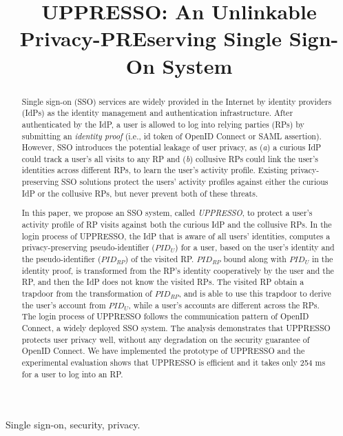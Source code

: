 \documentclass[conference, 10pt]{IEEEtran}
\begin{document}
\title{{UPPRESSO}: An Unlinkable Privacy-PREserving Single Sign-On System}
\maketitle
\begin{abstract}
Single sign-on (SSO) services
     are widely provided in the Internet by identity providers (IdPs) as the identity management
      and authentication infrastructure.
After authenticated by the IdP,
    a user is allowed to log into relying parties (RPs) by submitting an \emph{identity proof}
    (i.e., id token of OpenID Connect or SAML assertion).
However,
    SSO introduces the potential leakage of user privacy,
        as (\emph{a}) a curious IdP could track a user's all visits to any RP
            and (\emph{b}) collusive RPs could link the user's identities across different RPs,
            to learn the user's activity profile.
Existing privacy-preserving SSO solutions protect the users' activity profiles
    against either the curious IdP or the collusive RPs, but never prevent both of these threats.

In this paper, we propose an SSO system, called \emph{UPPRESSO},
     to protect a user's activity profile of RP visits
        against both the curious IdP and the collusive RPs.
In the login process of UPPRESSO,
 the IdP that is aware of all users' identities,
         computes a privacy-preserving pseudo-identifier ($PID_U$) for a user,
    based on the user's identity and the pseudo-identifier ($PID_{RP}$) of the visited RP.
$PID_{RP}$ bound along with $PID_U$ in the identity proof,
   is transformed from the RP's identity cooperatively by the user and the RP,
    and then the IdP does not know the visited RPs.
The visited RP obtain a trapdoor from the transformation of $PID_{RP}$,
    and is able to use this trapdoor to derive the user's account from $PID_U$,
 while a user's accounts are different across the RPs.
The login process of UPPRESSO follows the communication pattern of OpenID Connect, a widely deployed SSO system.
The analysis demonstrates that UPPRESSO protects user privacy well, without any degradation on the security guarantee of OpenID Connect.
We have implemented the prototype of UPPRESSO and
 the experimental evaluation shows that UPPRESSO is efficient and
  it takes only 254 ms for a user to log into an RP.
\end{abstract}
\begin{IEEEkeywords}
Single sign-on, security, privacy. %
\end{IEEEkeywords}
\end{document}
